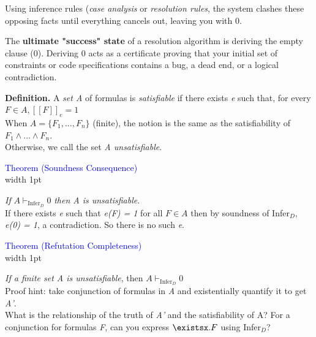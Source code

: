 \documentclass[11pt]{article}
\begin{document}
Using inference rules (\textit{case analysis} or \textit{resolution rules}, the system clashes these opposing facts until everything cancels out, leaving you with 0.

The \textbf{ultimate "success" state} of a resolution algorithm is deriving the empty clause (0). Deriving 0 acts as a certificate proving that your initial set of constraints or code specifications contains a bug, a dead end, or a logical contradiction.

\begin{tcolorbox}[
    enhanced,
    frame hidden,
    borderline west={2pt}{0pt}{black},
    boxsep=5pt,
    left=8pt
]
\textbf{Definition.} A \textit{set A} of formulas is \textit{satisfiable} if there exists \textit{e} such that, for every $F \in A, [\![F]\!]_e = 1$ \\

When $A = \{F_1, ..., F_n\}$ (finite), the notion is the same as the satisfiability of $F_1 \land ... \land F_n$. \\ 

Otherwise, we call the set \textit{A unsatisfiable}. 
\end{tcolorbox}

\textcolor{blue}{Theorem (Soundness Consequence)} \\
\noindent
\vrule width 1pt
\hspace{0.5em}
\begin{minipage}{0.9\textwidth}
\vspace{0.3cm}
\textit{If} $A \vdash_{\text{Infer}_D} 0$ \textit{then A is unsatisfiable}.  \\

If there exists \textit{e} such that \textit{e(F) = 1} for all $F \in A$ then by soundness of Infer$_D$, \textit{e(0) = 1}, a contradiction. So there is no such \textit{e}.
\end{minipage}

\textcolor{blue}{Theorem (Refutation Completeness)} \\ 
\noindent
\vrule width 1pt
\hspace{0.5em}
\begin{minipage}{0.9\textwidth}
\vspace{0.3cm}
\textit{If a finite set A is unsatisfiable}, then $A \vdash_{\text{Infer}_D} 0$ \\ 

Proof hint: take conjunction of formulas in \textit{A} and existentially quantify it to get \textit{A'}. \\
What is the relationship of the truth of \textit{A'} and the satisfiability of A? For a conjunction for formulas \textit{F}, can you express $\existsx. F$ using Infer$_D$?
\end{minipage}
\end{document}
